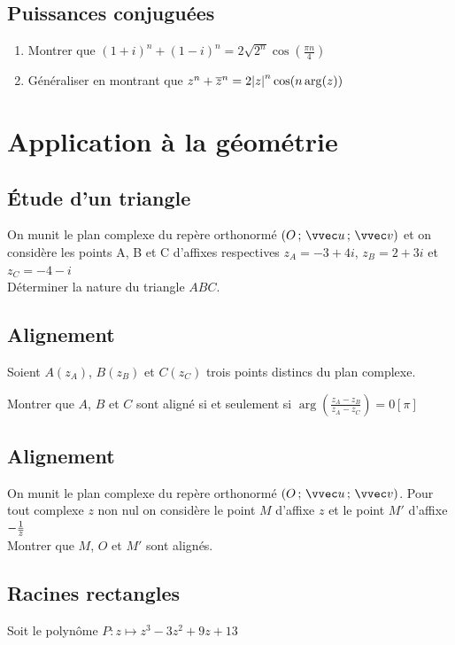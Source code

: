 \documentclass[oneside,12pt]{book}          %
\begin{document}
\subsection{Puissances conjuguées}
\begin{enumerate}
    \item Montrer que $(1+i)^n+(1-i)^n=2\sqrt{2^n}\cos\left(\frac{\pi n}{4}\right)$
    \item Généraliser en montrant que $z^n+{\overline{z}}^n=2{\left\lvert z \right\rvert}^n\cos(n\arg(z))$
\end{enumerate}



\section{Application à la géométrie}

\subsection{Étude d'un triangle}

On munit le plan complexe du repère orthonormé $\Ouv$ et on considère les points A, B et C d'affixes respectives $z_A=-3+4i$, $z_B=2+3i$ et $z_C=-4-i$ \\
Déterminer la nature du triangle $ABC$.



\subsection{Alignement}
Soient $A(z_A)$, $B(z_B)$ et $C(z_C)$ trois points distincs du plan complexe.

Montrer que $A$, $B$ et $C$ sont aligné si et seulement si $\arg\left(\frac{z_A-z_B}{z_A-z_C}\right)=0 \left[\pi\right]$



\subsection{Alignement}
On munit le plan complexe du repère orthonormé $\Ouv$. Pour tout complexe $z$ non nul on considère le point $M$ d'affixe $z$ et le point $M'$ d'affixe $-\frac{1}{{\overline{z}}}$ \\
Montrer que $M$, $O$ et $M'$ sont alignés.




\subsection{Racines rectangles}
Soit le polynôme $P:z\mapsto z^3-3z^2+9z+13$
\end{document}
